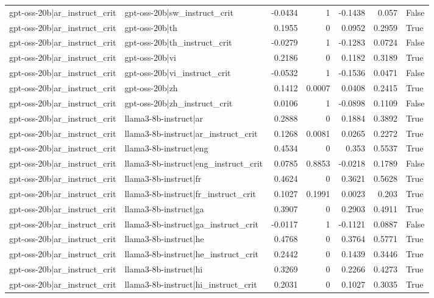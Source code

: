 \begin{table}
\begin{tabular}{l l r r r r l}
gpt-oss-20b|ar_instruct_crit & gpt-oss-20b|sw_instruct_crit & -0.0434 & 1 & -0.1438 & 0.057 & False \\
gpt-oss-20b|ar_instruct_crit & gpt-oss-20b|th & 0.1955 & 0 & 0.0952 & 0.2959 & True \\
gpt-oss-20b|ar_instruct_crit & gpt-oss-20b|th_instruct_crit & -0.0279 & 1 & -0.1283 & 0.0724 & False \\
gpt-oss-20b|ar_instruct_crit & gpt-oss-20b|vi & 0.2186 & 0 & 0.1182 & 0.3189 & True \\
gpt-oss-20b|ar_instruct_crit & gpt-oss-20b|vi_instruct_crit & -0.0532 & 1 & -0.1536 & 0.0471 & False \\
gpt-oss-20b|ar_instruct_crit & gpt-oss-20b|zh & 0.1412 & 0.0007 & 0.0408 & 0.2415 & True \\
gpt-oss-20b|ar_instruct_crit & gpt-oss-20b|zh_instruct_crit & 0.0106 & 1 & -0.0898 & 0.1109 & False \\
gpt-oss-20b|ar_instruct_crit & llama3-8b-instruct|ar & 0.2888 & 0 & 0.1884 & 0.3892 & True \\
gpt-oss-20b|ar_instruct_crit & llama3-8b-instruct|ar_instruct_crit & 0.1268 & 0.0081 & 0.0265 & 0.2272 & True \\
gpt-oss-20b|ar_instruct_crit & llama3-8b-instruct|eng & 0.4534 & 0 & 0.353 & 0.5537 & True \\
gpt-oss-20b|ar_instruct_crit & llama3-8b-instruct|eng_instruct_crit & 0.0785 & 0.8853 & -0.0218 & 0.1789 & False \\
gpt-oss-20b|ar_instruct_crit & llama3-8b-instruct|fr & 0.4624 & 0 & 0.3621 & 0.5628 & True \\
gpt-oss-20b|ar_instruct_crit & llama3-8b-instruct|fr_instruct_crit & 0.1027 & 0.1991 & 0.0023 & 0.203 & True \\
gpt-oss-20b|ar_instruct_crit & llama3-8b-instruct|ga & 0.3907 & 0 & 0.2903 & 0.4911 & True \\
gpt-oss-20b|ar_instruct_crit & llama3-8b-instruct|ga_instruct_crit & -0.0117 & 1 & -0.1121 & 0.0887 & False \\
gpt-oss-20b|ar_instruct_crit & llama3-8b-instruct|he & 0.4768 & 0 & 0.3764 & 0.5771 & True \\
gpt-oss-20b|ar_instruct_crit & llama3-8b-instruct|he_instruct_crit & 0.2442 & 0 & 0.1439 & 0.3446 & True \\
gpt-oss-20b|ar_instruct_crit & llama3-8b-instruct|hi & 0.3269 & 0 & 0.2266 & 0.4273 & True \\
gpt-oss-20b|ar_instruct_crit & llama3-8b-instruct|hi_instruct_crit & 0.2031 & 0 & 0.1027 & 0.3035 & True \\

\end{tabular}
\end{table}
